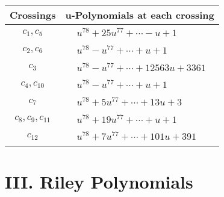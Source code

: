 \documentclass[1p]{elsarticle_modified}
\theoremstyle{definition}
\begin{document}
\begin{tabular}{m{50pt}|m{274pt}}
Crossings & \hspace{64pt}u-Polynomials at each crossing \\
\hline $$\begin{aligned}c_{1},c_{5}\end{aligned}$$&$\begin{aligned}
&u^{78}+25 u^{77}+\cdots- u+1
\end{aligned}$\\
\hline $$\begin{aligned}c_{2},c_{6}\end{aligned}$$&$\begin{aligned}
&u^{78}- u^{77}+\cdots+u+1
\end{aligned}$\\
\hline $$\begin{aligned}c_{3}\end{aligned}$$&$\begin{aligned}
&u^{78}- u^{77}+\cdots+12563 u+3361
\end{aligned}$\\
\hline $$\begin{aligned}c_{4},c_{10}\end{aligned}$$&$\begin{aligned}
&u^{78}- u^{77}+\cdots+u+1
\end{aligned}$\\
\hline $$\begin{aligned}c_{7}\end{aligned}$$&$\begin{aligned}
&u^{78}+5 u^{77}+\cdots+13 u+3
\end{aligned}$\\
\hline $$\begin{aligned}c_{8},c_{9},c_{11}\end{aligned}$$&$\begin{aligned}
&u^{78}+19 u^{77}+\cdots+u+1
\end{aligned}$\\
\hline $$\begin{aligned}c_{12}\end{aligned}$$&$\begin{aligned}
&u^{78}+7 u^{77}+\cdots+101 u+391
\end{aligned}$\\
\hline
\end{tabular}\newpage\renewcommand{\arraystretch}{1}
\centering \section*{ III. Riley Polynomials}
\end{document}
